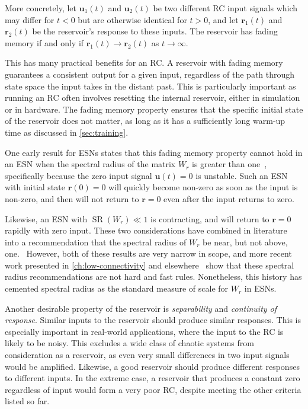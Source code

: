 More concretely, let $\bm{u}_1(t)$ and $\bm{u}_2(t)$ be two different
RC input signals which may differ for $t < 0$ but are otherwise
identical for $t > 0$, and let $\bm{r}_1(t)$ and $\bm{r}_2(t)$ be the
reservoir's response to these inputs. The reservoir has fading memory
if and only if $\bm{r}_1(t) \rightarrow \bm{r}_2(t)$ as $t \rightarrow \infty$.

This has many practical benefits for an RC. A reservoir with fading
memory guarantees a consistent output for a given input, regardless of
the path through state space the input takes in the distant past. This
is particularly important as running an RC often involves
resetting the internal reservoir, either in simulation or in
hardware. The fading memory property ensures that the specific initial
state of the reservoir does not matter, as long as it has a
sufficiently long warm-up time as discussed in \cref{sec:training}.

One early result for ESNs states that this fading memory property
cannot hold in an ESN when the spectral radius of the matrix $W_r$ is
greater than one~\cite{jaeger2001}, specifically because the zero
input signal $\bm{u}(t) = 0$ is unstable. Such an ESN with initial
state $\bm{r}(0) = 0$ will quickly become non-zero as soon as the
input is non-zero, and then will not return to $\bm{r} = 0$ even after
the input returns to zero.

Likewise, an ESN with $\operatorname{SR}(W_r) \ll 1$ is contracting,
and will return to $\bm{r} = 0$ rapidly with zero input. These two
considerations have combined in literature into a recommendation that
the spectral radius of $W_r$ be near, but not above,
one.~\cite{lukosevicius2012} However, both of these results are very
narrow in scope, and more recent work presented in \cref{ch:low-connectivity}
and elsewhere~\cite{pathak2017,rodan2011} show that these spectral
radius recommendations are not hard and fast rules. Nonetheless, this
history has cemented spectral radius as the standard measure of scale
for $W_r$ in ESNs.

Another desirable property of the reservoir is \emph{separability} and
\emph{continuity of response}. Similar inputs to the reservoir should produce
similar responses. This is especially important in real-world
applications, where the input to the RC is likely to be noisy. This
excludes a wide class of chaotic systems from consideration as a
reservoir, as even very small differences in two input signals would
be amplified. Likewise, a good reservoir should produce different
responses to different inputs. In the extreme case, a reservoir that
produces a constant zero regardless of input would form a very poor RC,
despite meeting the other criteria listed so far.

